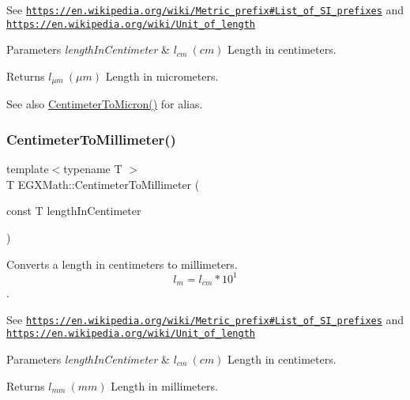 See \href{https://en.wikipedia.org/wiki/Metric_prefix#List_of_SI_prefixes}{\tt https\+://en.\+wikipedia.\+org/wiki/\+Metric\+\_\+prefix\#\+List\+\_\+of\+\_\+\+S\+I\+\_\+prefixes} and \href{https://en.wikipedia.org/wiki/Unit_of_length}{\tt https\+://en.\+wikipedia.\+org/wiki/\+Unit\+\_\+of\+\_\+length} 
\begin{DoxyParams}{Parameters}
{\em length\+In\+Centimeter} & $ l_{cm}\ (cm)$ Length in centimeters. \\
\hline
\end{DoxyParams}
\begin{DoxyReturn}{Returns}
$ l_{\mu m}\ (\mu m)$ Length in micrometers. 
\end{DoxyReturn}
\begin{DoxySeeAlso}{See also}
\mbox{\hyperlink{group___e_g_x_math-_conversions-_length_conversions-_centimeter-_non-_s_i_gaee509ac676e86ed54994792f82dab9f7}{Centimeter\+To\+Micron()}} for alias. 
\end{DoxySeeAlso}
\mbox{\label{group___e_g_x_math-_conversions-_length_conversions-_centimeter-_s_i_ga3adaa50da05ec6ead83e93dbd9406ae0}} 
\subsubsection{\texorpdfstring{Centimeter\+To\+Millimeter()}{CentimeterToMillimeter()}}
{\footnotesize\ttfamily template$<$typename T $>$ \\
T E\+G\+X\+Math\+::\+Centimeter\+To\+Millimeter (\begin{DoxyParamCaption}\item[{const T}]{length\+In\+Centimeter }\end{DoxyParamCaption})}



Converts a length in centimeters to millimeters. \[ l_{m}=l_{cm} * 10^{1} \]. 

See \href{https://en.wikipedia.org/wiki/Metric_prefix#List_of_SI_prefixes}{\tt https\+://en.\+wikipedia.\+org/wiki/\+Metric\+\_\+prefix\#\+List\+\_\+of\+\_\+\+S\+I\+\_\+prefixes} and \href{https://en.wikipedia.org/wiki/Unit_of_length}{\tt https\+://en.\+wikipedia.\+org/wiki/\+Unit\+\_\+of\+\_\+length} 
\begin{DoxyParams}{Parameters}
{\em length\+In\+Centimeter} & $ l_{cm}\ (cm)$ Length in centimeters. \\
\hline
\end{DoxyParams}
\begin{DoxyReturn}{Returns}
$ l_{mm}\ (mm)$ Length in millimeters. 
\end{DoxyReturn}
\mbox{\label{group___e_g_x_math-_conversions-_length_conversions-_centimeter-_s_i_gacf80778df778af3266027dbe32bfd2d4}} 
